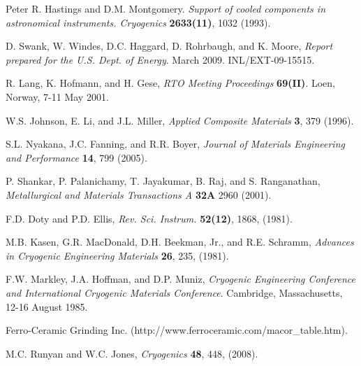 \documentclass[final]{svjour2}
\begin{document}
\begin{thebibliography}{99}

Peter R. Hastings and D.M. Montgomery. {\it Support of cooled components in astronomical instruments. Cryogenics} \textbf{2633(11)}, 1032 (1993).


D. Swank, W. Windes, D.C. Haggard, D. Rohrbaugh, and K. Moore, {\it Report prepared for the U.S. Dept. of Energy}. March 2009. INL/EXT-09-15515.

R. Lang, K. Hofmann, and H. Gese, {\it RTO Meeting Proceedings} \textbf{69(II)}. Loen, Norway, 7-11 May 2001.

W.S. Johnson, E. Li, and J.L. Miller, {\it Applied Composite Materials} \textbf{3}, 379 (1996).

S.L. Nyakana, J.C. Fanning, and R.R. Boyer, {\it Journal of Materials Engineering and Performance} \textbf{14}, 799 (2005).

P. Shankar, P. Palanichamy, T. Jayakumar, B. Raj, and S. Ranganathan, {\it Metallurgical and Materials Transactions A} \textbf{32A} 2960 (2001).

F.D. Doty and P.D. Ellis, {\it Rev. Sci. Instrum.} \textbf{52(12)}, 1868, (1981).

M.B. Kasen, G.R. MacDonald, D.H. Beekman, Jr., and R.E. Schramm, {\it Advances in Cryogenic Engineering Materials} \textbf{26}, 235, (1981).

F.W. Markley, J.A. Hoffman, and D.P. Muniz, {\it Cryogenic Engineering Conference and International Cryogenic Materials Conference}. Cambridge, Massachusetts, 12-16 August 1985.

Ferro-Ceramic Grinding Inc. (http://www.ferroceramic.com/macor\_table.htm).


M.C. Runyan and W.C. Jones, {\it Cryogenics} \textbf{48}, 448, (2008).


\end{thebibliography}
\end{document}
